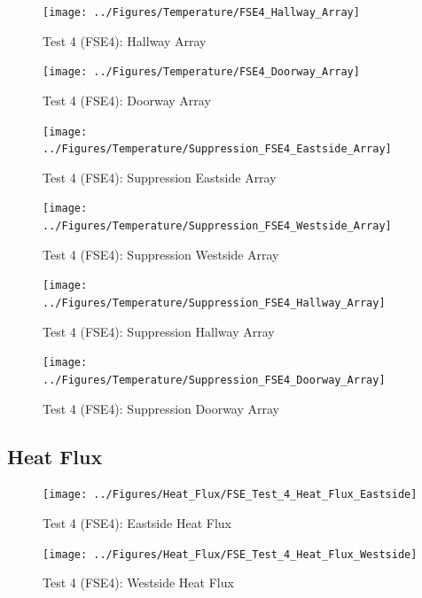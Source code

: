\documentclass[12pt,oneside]{book}
\begin{document}
\begin{figure}[!ht]
	\texttt{[image: ../Figures/Temperature/FSE4\_Hallway\_Array]}
	\caption{Test 4 (FSE4): Hallway Array}
	\label{fig:Test_4_Hallway_Array}
\end{figure}

\begin{figure}[!ht]
	\texttt{[image: ../Figures/Temperature/FSE4\_Doorway\_Array]}
	\caption{Test 4 (FSE4): Doorway Array}
	\label{fig:Test_4_Doorway_Array}
\end{figure}

\begin{figure}[!ht]
	\texttt{[image: ../Figures/Temperature/Suppression\_FSE4\_Eastside\_Array]}
	\caption{Test 4 (FSE4): Suppression Eastside Array}
	\label{fig:Test_4_Suppression_Eastside_Array}
\end{figure}

\begin{figure}[!ht]
	\texttt{[image: ../Figures/Temperature/Suppression\_FSE4\_Westside\_Array]}
	\caption{Test 4 (FSE4): Suppression Westside Array}
	\label{fig:Test_4_Suppression_Westside_Array}
\end{figure}

\begin{figure}[!ht]
	\texttt{[image: ../Figures/Temperature/Suppression\_FSE4\_Hallway\_Array]}
	\caption{Test 4 (FSE4): Suppression Hallway Array}
	\label{fig:Test_4_Suppression_Hallway_Array}
\end{figure}

\begin{figure}[!ht]
	\texttt{[image: ../Figures/Temperature/Suppression\_FSE4\_Doorway\_Array]}
	\caption{Test 4 (FSE4): Suppression Doorway Array}
	\label{fig:Test_4_Suppression_Doorway_Array}
\end{figure}

\subsection{Heat Flux}
\label{subsec:Heat_Flux}

\begin{figure}[!ht]
	\texttt{[image: ../Figures/Heat\_Flux/FSE\_Test\_4\_Heat\_Flux\_Eastside]}
	\caption{Test 4 (FSE4): Eastside Heat Flux}
	\label{fig:Test_4_Eastside_Heat_Flux}
\end{figure}

\begin{figure}[!ht]
	\texttt{[image: ../Figures/Heat\_Flux/FSE\_Test\_4\_Heat\_Flux\_Westside]}
	\caption{Test 4 (FSE4): Westside Heat Flux}
	\label{fig:Test_4_Westside_Heat_Flux}
\end{figure}
\end{document}
